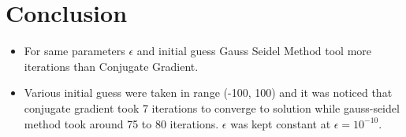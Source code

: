 \documentclass[12pt]{article}
\begin{document}
\section{Conclusion}
\begin{itemize}
    \item For same parameters $\epsilon$ and initial guess Gauss Seidel Method tool more iterations than Conjugate Gradient.
    \item Various initial guess were taken in range (-100, 100) and it was noticed that conjugate gradient took 7 iterations to converge to solution while gauss-seidel method took around 75 to 80 iterations. $\epsilon$ was kept constant at $\epsilon = 10^{-10}$.
\end{itemize}
\end{document}
